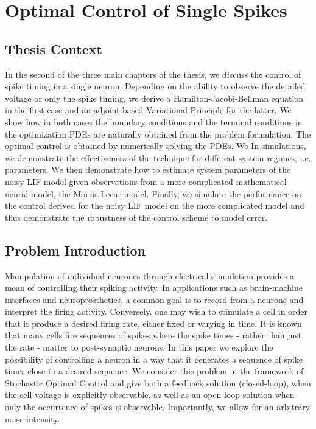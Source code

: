 \chapter{Optimal Control of Single Spikes}
\label{ch:spike_control}
\graphicspath{{../OptSpike/}}


\section{Thesis Context}
In the second of the three main chapters of the thesis, we discuss the control
of spike timing in a single neuron. Depending on the ability to observe the
detailed voltage or only the spike timing, we derive a Hamilton-Jacobi-Bellman
equation in the first case and an adjoint-based Variational Principle for the
latter. We show how in both cases the boundary conditions and the terminal
conditions in the optimization PDEs are naturally obtained from the problem
formulation. The optimal control is obtained by numerically solving the PDEs. We
In simulations, we demonstrate the effectiveness of the technique for
different system regimes, i.e. parameters. We then
demonstrate how to estimate system parameters of the noisy LIF model given
observations from a more complicated mathematical neural model, the Morris-Lecar
model. Finally, we simulate the performance on the control derived for the
noisy LIF model on the more complicated model and thus demonstrate the
robustness of the control scheme to model error. 


\section{Problem Introduction} 
Manipulation of individual neurones through electrical stimulation provides a
mean of controlling their spiking activity. In applications such as
brain-machine interfaces and neuroprosthetics, a common goal is to record from a
neurone and interpret the firing activity. Conversely, one may wish to stimulate
a cell in order that it produce a desired firing rate, either fixed or varying
in time. It is known that many cells fire sequences of spikes where the spike
times - rather than just the rate - matter to post-synaptic neurons. In this
paper we explore the possibility of controlling a neuron in a way that it
generates a sequence of spike times close to a desired sequence. 
We consider this problem in the framework of Stochastic Optimal Control and
give both a feedback solution (closed-loop), when the cell voltage is
explicitly observable, as well as an open-loop solution when only the
occurrence of spikes is observable. Importantly, we allow for an
arbitrary noise intensity.

